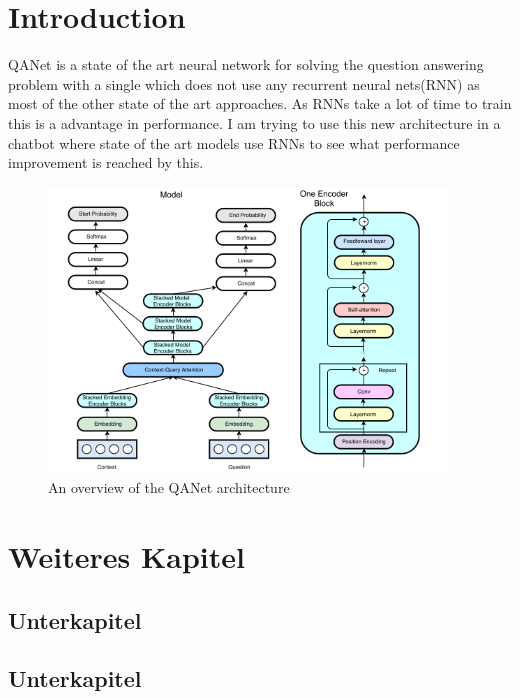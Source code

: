 \section{Introduction}\raggedbottom 

QANet is a state of the art neural network for solving the question answering problem with a single which does not use any recurrent neural nets(RNN) as most of the other state of the art approaches. As RNNs take a lot of time to train this is a advantage in performance. I am trying to use this new architecture in a chatbot where state of the art models use RNNs to see what performance improvement is reached by this.

\begin{figure}[htb]
\begin{center}
  \includegraphics[width=300pt, angle=0]{bilder/QANetArchitecture}
  \caption{An overview of the QANet architecture}\label{fig_QANet}
\end{center}
\end{figure}


\pagebreak
\section{Weiteres Kapitel}\raggedbottom 
\subsection{Unterkapitel}
\subsection{Unterkapitel}